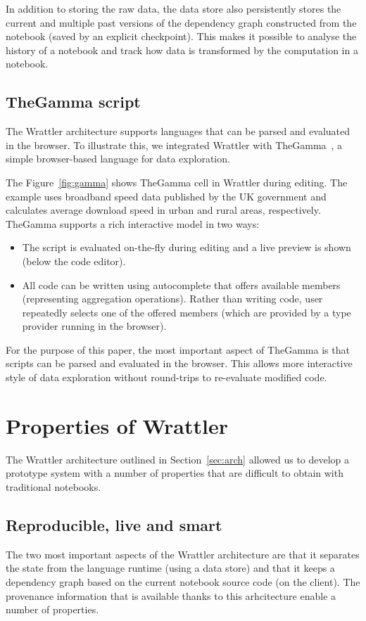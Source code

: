 \documentclass[sigplan]{acmart}\settopmatter{printfolios=true,printccs=false,printacmref=false}
\begin{document}
In addition to storing the raw data, the data store also persistently stores the current and
multiple past versions of the dependency graph constructed from the notebook (saved by an 
explicit checkpoint). This makes it possible to analyse the history of a notebook and track how
data is transformed by the computation in a notebook.

\subsection{TheGamma script}
\label{sec:comp-gamma}

The Wrattler architecture supports languages that can be parsed and evaluated in the browser.
To illustrate this, we integrated Wrattler with TheGamma~\cite{thegamma}, a simple browser-based 
language for data exploration.

The Figure~\ref{fig:gamma} shows TheGamma cell in Wrattler during editing. The example uses
broadband speed data published by the UK government \cite{ofcom} and calculates average download
speed in urban and rural areas, respectively. TheGamma supports a rich interactive model in two ways:
%
\begin{itemize}
\item The script is evaluated on-the-fly during editing and a live preview is shown 
  (below the code editor).
\item All code can be written using autocomplete that offers available members (representing
  aggregation operations). Rather than writing code, user repeatedly selects one of the offered 
  members (which are provided by a type provider \cite{providers} running in the browser).
\end{itemize}

For the purpose of this paper, the most important aspect of TheGamma is that scripts can be 
parsed and evaluated in the browser. This allows more interactive style of data exploration
without round-trips to re-evaluate modified code.

\section{Properties of Wrattler}
\label{sec:results}

The Wrattler architecture outlined in Section~\ref{sec:arch} allowed us to develop a prototype 
system with a number of properties that are difficult to obtain with traditional notebooks.

\subsection{Reproducible, live and smart}
The two most important aspects of the Wrattler architecture are that it separates the state from 
the language runtime (using a data store) and that it keeps a dependency graph based on the current
notebook source code (on the client). The provenance information that is available thanks to this
arhcitecture enable a number of properties.
\end{document}
